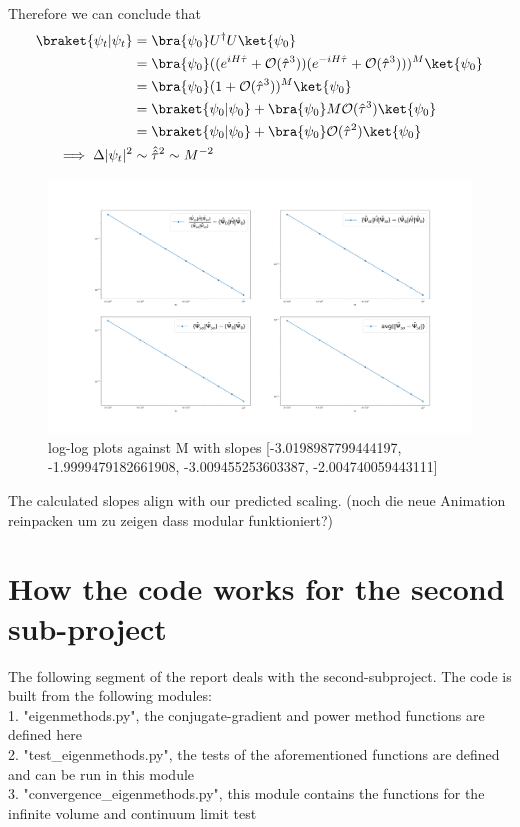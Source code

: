 \documentclass[11pt, letterpaper, onecolumn]{article}
\begin{document}
Therefore we can conclude that
\begin{align*}
    \braket{\psi_t|\psi_t}&=\bra{\psi_0}U^\dagger U\ket{\psi_0}\\
    &=\bra{\psi_0}((e^{iH\hat{\tau}}+\mathcal{O}(\hat{\tau}^3))(e^{-iH\hat{\tau}}+\mathcal{O}(\hat{\tau}^3)))^M\ket{\psi_0}\\
    &=\bra{\psi_0}(1+\mathcal{O}(\hat{\tau}^3))^M\ket{\psi_0}\\
    &=\braket{\psi_0|\psi_0}+\bra{\psi_0}M\mathcal{O}(\hat{\tau}^3)\ket{\psi_0}\\
    &=\braket{\psi_0|\psi_0}+\bra{\psi_0}\mathcal{O}(\hat{\tau}^2)\ket{\psi_0}\\
    \implies \Delta|\psi_t|^2&\sim\hat{\hat{\tau}}^2\sim M^{-2}
\end{align*}
	\begin{figure} [H] 
	\begin{center}
	\includegraphics[width=16cm]{"final_loglog_1.png"}
	\caption{log-log plots against M with slopes [-3.0198987799444197, -1.9999479182661908, -3.009455253603387, -2.004740059443111]}
	\end{center}
	\end{figure}
    \noindent
	The calculated slopes align with our predicted scaling.
 	(noch die neue Animation reinpacken um zu zeigen dass modular funktioniert?)




	\newpage


   
	\section{How the code works for the second sub-project}	
	The following segment of the report deals with the second-subproject. The code is built from the following modules:\\
    1. "eigenmethods.py", the conjugate-gradient and power method functions are defined here\\
    2. "test\_eigenmethods.py", the tests of the aforementioned functions are defined and can be run in this module\\
    3. "convergence\_eigenmethods.py", this module contains the functions for the infinite volume and continuum limit test\\
	
\end{document}
